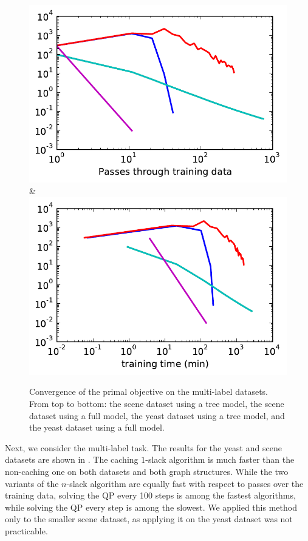\begin{figure}
\begin{tabu}
    \includegraphics[width=\linewidth]{evaluation/images/yeast_full}&%
    \includegraphics[width=\linewidth]{evaluation/images/yeast_full_time}
    \end{tabu}
\caption{%
   Convergence of the primal objective on the multi-label datasets. From top to
   bottom: the scene dataset using a tree model, the scene dataset using a full
   model, the yeast dataset using a tree model, and the yeast dataset using a
   full model.
}
\end{figure}

Next, we consider the multi-label task.  The results for the yeast and scene
datasets are shown in . The caching $1$-slack
algorithm is much faster than the non-caching one on both datasets and both
graph structures.
While the two variants of the $n$-slack algorithm are equally fast with respect
to passes over the training data, solving the QP every 100 steps is among the
fastest algorithms, while solving the QP every step is among the slowest.
We applied this method only to the smaller scene dataset, as applying it on the
yeast dataset was not practicable.

